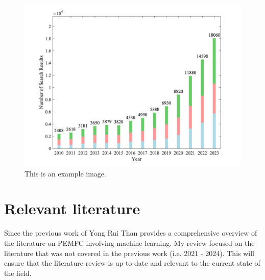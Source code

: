    \begin{figure}[H]
        \centering
        \includegraphics[width=1\textwidth]{00_Images/00_Literature_Review/00_PEMFC_ML_NN_DL_July_12_2024_v1.jpg}  %
        \caption{This is an example image.}
        \label{fig:example1}
    \end{figure}

\section{Relevant literature}

    Since the previous work of Yong Rui Than provides a comprehensive overview of the literature on PEMFC involving machine learning. 
    \noindent My review focused on the literature that was not covered in the previous work (i.e. 2021 - 2024). This will ensure that the literature review is up-to-date and relevant to the current state of the field.
    
